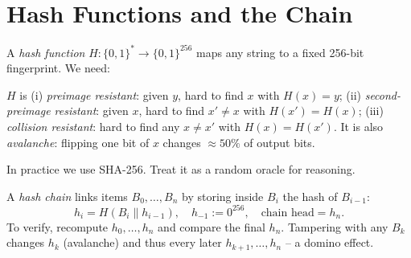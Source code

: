 \section{Hash Functions and the Chain}\label{sec:hash-chain}
A \emph{hash function} $H:\{0,1\}^*\to\{0,1\}^{256}$ maps any string to a fixed 256-bit fingerprint. We need:

\begin{definition}\label{def:hash-sec}
$H$ is (i) \emph{preimage resistant}: given $y$, hard to find $x$ with $H(x)=y$; (ii) \emph{second-preimage resistant}: given $x$, hard to find $x'\ne x$ with $H(x')=H(x)$; (iii) \emph{collision resistant}: hard to find any $x\ne x'$ with $H(x)=H(x')$. It is also \emph{avalanche}: flipping one bit of $x$ changes $\approx50\%$ of output bits.
\end{definition}

In practice we use SHA-256. Treat it as a random oracle for reasoning.

A \emph{hash chain} links items $B_0,\dots,B_n$ by storing inside $B_i$ the hash of $B_{i-1}$:
\begin{equation}\label{eq:hash-chain}
h_i = H(B_i \parallel h_{i-1}),\quad h_{-1}:=0^{256},\quad \text{chain head}=h_n .
\end{equation}
To verify, recompute $h_0,\dots,h_n$ and compare the final $h_n$. Tampering with any $B_k$ changes $h_k$ (avalanche) and thus every later $h_{k+1},\dots,h_n$ -- a domino effect.

